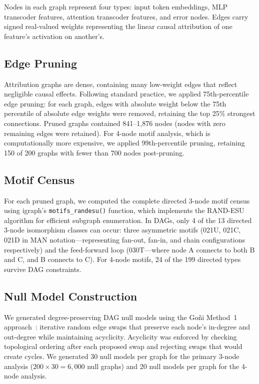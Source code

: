 \documentclass[11pt,letterpaper]{article}
\begin{document}
Nodes in each graph represent four types: input token embeddings, MLP transcoder features, attention transcoder features, and error nodes. Edges carry signed real-valued weights representing the linear causal attribution of one feature's activation on another's.

\subsection{Edge Pruning}

Attribution graphs are dense, containing many low-weight edges that reflect negligible causal effects. Following standard practice, we applied 75th-percentile edge pruning: for each graph, edges with absolute weight below the 75th percentile of absolute edge weights were removed, retaining the top 25\% strongest connections. Pruned graphs contained 841--1,876 nodes (nodes with zero remaining edges were retained). For 4-node motif analysis, which is computationally more expensive, we applied 99th-percentile pruning, retaining 150 of 200 graphs with fewer than 700 nodes post-pruning.

\subsection{Motif Census}

For each pruned graph, we computed the complete directed 3-node motif census using igraph's \texttt{motifs\_randesu()} function, which implements the RAND-ESU algorithm for efficient subgraph enumeration. In DAGs, only 4 of the 13 directed 3-node isomorphism classes can occur: three asymmetric motifs (021U, 021C, 021D in MAN notation---representing fan-out, fan-in, and chain configurations respectively) and the feed-forward loop (030T---where node A connects to both B and C, and B connects to C). For 4-node motifs, 24 of the 199 directed types survive DAG constraints.

\subsection{Null Model Construction}

We generated degree-preserving DAG null models using the Go\~{n}i Method~1 approach~\citep{Goni2014}: iterative random edge swaps that preserve each node's in-degree and out-degree while maintaining acyclicity. Acyclicity was enforced by checking topological ordering after each proposed swap and rejecting swaps that would create cycles. We generated 30 null models per graph for the primary 3-node analysis ($200 \times 30 = 6{,}000$ null graphs) and 20 null models per graph for the 4-node analysis.
\end{document}

